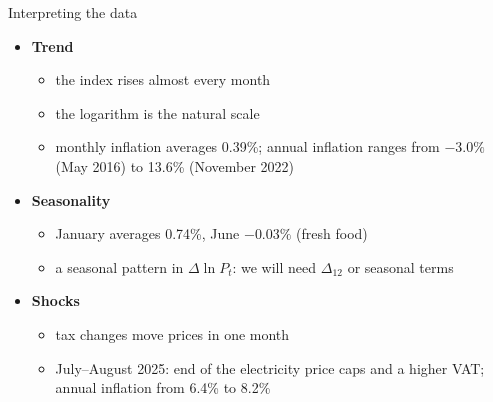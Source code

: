 \begin{frame}{Interpreting the data}
\itemsize{\small}
\begin{itemize}
    \item \textbf{Trend}
    \begin{itemize}
        \item the index rises almost every month
        \item the logarithm is the natural scale
        \item monthly inflation averages 0.39\%; annual inflation ranges from $\ensuremath{-}3.0\%$ (May 2016) to 13.6\% (November 2022)
    \end{itemize}
    \item \textbf{Seasonality}
    \begin{itemize}
        \item January averages 0.74\%, June $\ensuremath{-}0.03\%$ (fresh food)
        \item a seasonal pattern in $\Delta\ln P_t$: we will need $\Delta_{12}$ or seasonal terms
    \end{itemize}
    \item \textbf{Shocks}
    \begin{itemize}
        \item tax changes move prices in one month
        \item July--August 2025: end of the electricity price caps and a higher VAT; annual inflation from 6.4\% to 8.2\%
    \end{itemize}
\end{itemize}
\end{frame}

